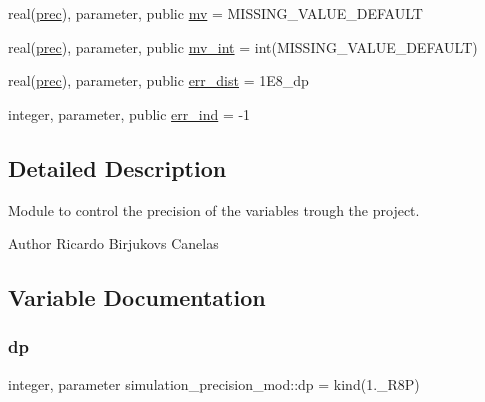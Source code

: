 \begin{DoxyCompactItemize}
\item 
real(\hyperlink{namespacesimulation__precision__mod_aaff1ddf996761a1e11e787d63e1612f6}{prec}), parameter, public \hyperlink{namespacesimulation__precision__mod_a39845d8a0d331a7b9225feb5fe19ba3b}{mv} = M\+I\+S\+S\+I\+N\+G\+\_\+\+V\+A\+L\+U\+E\+\_\+\+D\+E\+F\+A\+U\+LT
\item 
real(\hyperlink{namespacesimulation__precision__mod_aaff1ddf996761a1e11e787d63e1612f6}{prec}), parameter, public \hyperlink{namespacesimulation__precision__mod_abcad51274c804cb573d8f5720c5dfa05}{mv\+\_\+int} = int(M\+I\+S\+S\+I\+N\+G\+\_\+\+V\+A\+L\+U\+E\+\_\+\+D\+E\+F\+A\+U\+LT)
\item 
real(\hyperlink{namespacesimulation__precision__mod_aaff1ddf996761a1e11e787d63e1612f6}{prec}), parameter, public \hyperlink{namespacesimulation__precision__mod_ae3222dd2d51f6b7221be1ca1c70e3e6c}{err\+\_\+dist} = 1\+E8\+\_\+dp
\item 
integer, parameter, public \hyperlink{namespacesimulation__precision__mod_a82a4b689dc26018c961193b991c489d4}{err\+\_\+ind} = -\/1
\end{DoxyCompactItemize}


\subsection{Detailed Description}
Module to control the precision of the variables trough the project. 

\begin{DoxyAuthor}{Author}
Ricardo Birjukovs Canelas 
\end{DoxyAuthor}


\subsection{Variable Documentation}
\mbox{\label{namespacesimulation__precision__mod_a4d49b0033a5e2bc6693c5b2dfb63a032}} 
\subsubsection{\texorpdfstring{dp}{dp}}
{\footnotesize\ttfamily integer, parameter simulation\+\_\+precision\+\_\+mod\+::dp = kind(1.\+\_\+\+R8P)\hspace{0.3cm}{\ttfamily [private]}}



